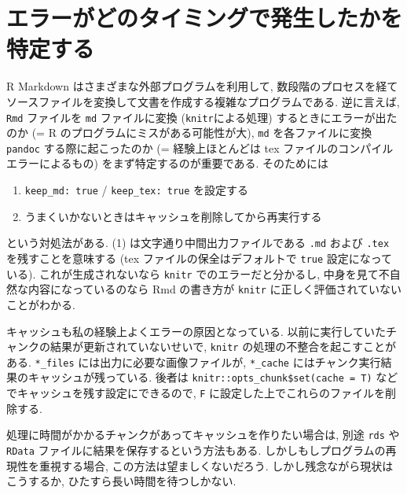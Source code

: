 \documentclass[
  xelatex,ja=standard,jafont=noto]{bxjsbook}
\providecommand{\tightlist}{%
  \setlength{\itemsep}{0pt}\setlength{\parskip}{0pt}}
\theoremstyle{definition}
\theoremstyle{definition}
\theoremstyle{definition}
\theoremstyle{definition}
\theoremstyle{remark}
\begin{document}
\hypertarget{ux30a8ux30e9ux30fcux304cux3069ux306eux30bfux30a4ux30dfux30f3ux30b0ux3067ux767aux751fux3057ux305fux304bux3092ux7279ux5b9aux3059ux308b}{%
\section{エラーがどのタイミングで発生したかを特定する}\label{ux30a8ux30e9ux30fcux304cux3069ux306eux30bfux30a4ux30dfux30f3ux30b0ux3067ux767aux751fux3057ux305fux304bux3092ux7279ux5b9aux3059ux308b}}

R Markdown はさまざまな外部プログラムを利用して,
数段階のプロセスを経てソースファイルを変換して文書を作成する複雑なプログラムである.
逆に言えば, \texttt{Rmd} ファイルを \texttt{md} ファイルに変換
(\texttt{knitr}による処理) するときにエラーが出たのか (= R
のプログラムにミスがある可能性が大), \texttt{md} を各ファイルに変換
\texttt{pandoc} する際に起こったのか (= 経験上ほとんどは tex
ファイルのコンパイルエラーによるもの) をまず特定するのが重要である.
そのためには

\begin{enumerate}
\def\labelenumi{\arabic{enumi}.}
\tightlist
\item
  \texttt{keep\_md:\ true} / \texttt{keep\_tex:\ true} を設定する
\item
  うまくいかないときはキャッシュを削除してから再実行する
\end{enumerate}

という対処法がある. (1) は文字通り中間出力ファイルである \texttt{.md}
および \texttt{.tex} を残すことを意味する (tex
ファイルの保全はデフォルトで \texttt{true} 設定になっている).
これが生成されないなら \texttt{knitr} でのエラーだと分かるし,
中身を見て不自然な内容になっているのなら Rmd の書き方が \texttt{knitr}
に正しく評価されていないことがわかる.

キャッシュも私の経験上よくエラーの原因となっている.
以前に実行していたチャンクの結果が更新されていないせいで, \texttt{knitr}
の処理の不整合を起こすことがある. \texttt{*\_files}
には出力に必要な画像ファイルが, \texttt{*\_cache}
にはチャンク実行結果のキャッシュが残っている. 後者は
\texttt{knitr::opts\_chunk\$set(cache\ =\ T)}
などでキャッシュを残す設定にできるので, \texttt{F}
に設定した上でこれらのファイルを削除する.

処理に時間がかかるチャンクがあってキャッシュを作りたい場合は, 別途
\texttt{rds} や \texttt{RData} ファイルに結果を保存するという方法もある.
しかしもしプログラムの再現性を重視する場合,
この方法は望ましくないだろう. しかし残念ながら現状はこうするか,
ひたすら長い時間を待つしかない.
\end{document}
